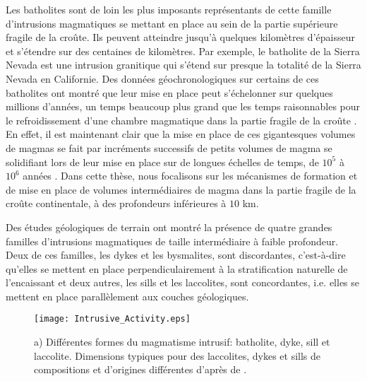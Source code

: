 Les batholites sont de loin  les plus imposants représentants de cette
famille d'intrusions  magmatiques se  mettant en place  au sein  de la
partie supérieure fragile de la croûte.  Ils peuvent atteindre jusqu'à
quelques  kilomètres d'épaisseur  et  s'étendre sur  des centaines  de
kilomètres.  Par  exemple, le  batholite de la  Sierra Nevada  est une
intrusion granitique qui s'étend sur  presque la totalité de la Sierra
Nevada en  Californie.  Des données géochronologiques  sur certains de
ces batholites ont montré que leur mise en place peut s'échelonner sur
quelques millions d'années, un temps beaucoup plus grand que les temps
raisonnables pour le refroidissement  d'une chambre magmatique dans la
partie fragile de  la croûte \citep{Glazner:2004gv}. En  effet, il est
maintenant clair que  la mise en place de ces  gigantesques volumes de
magmas se fait par incréments successifs de petits volumes de magma se
solidifiant lors  de leur  mise en  place sur  de longues  échelles de
temps,         de        $10^5$         à        $10^6$         années
\citep{Petford:2000cc,Glazner:2004gv}.    Dans   cette   thèse,   nous
focalisons sur  les mécanismes  de formation  et de  mise en  place de
volumes intermédiaires  de magma dans  la partie fragile de  la croûte
continentale, à des profondeurs inférieures à $10$ km.

Des études  géologiques de  terrain ont montré  la présence  de quatre
grandes familles  d'intrusions magmatiques  de taille  intermédiaire à
faible profondeur.  Deux de ces familles, les dykes et les bysmalites,
sont  discordantes,   c'est-à-dire  qu'elles   se  mettent   en  place
perpendiculairement à  la stratification naturelle de  l'encaissant et
deux  autres,   les  sills  et  les   laccolites,  sont  concordantes,
i.e. elles se mettent en place parallèlement aux couches géologiques.

\begin{figure}[htpb]
  \begin{center}
    \graphicspath{ {/Users/thorey/Documents/These/Manuscript/Figure/Chapter1/} }
    \texttt{[image: Intrusive\_Activity.eps]}
    \caption{a) Différentes formes  du magmatisme intrusif: batholite,
      dyke,  sill   et  laccolite.    Dimensions  typiques   pour  des
      laccolites,  dykes  et  sills   de  compositions  et  d'origines
      différentes d'après de \citet{Cruden:tg}. }
    \label{C1-Dimension}
  \end{center}
\end{figure}

